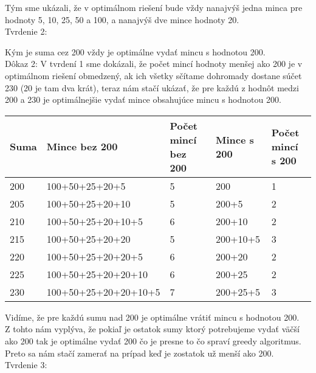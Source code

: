 \documentclass[a4paper]{article}
\begin{document}
Tým sme ukázali, že v optimálnom riešení bude vždy nanajvýš jedna minca pre hodnoty 5, 10, 25, 50 a 100, a nanajvýš dve mince hodnoty 20.
\\

Tvrdenie 2:

Kým je suma cez 200 vždy je optimálne vydať mincu s hodnotou 200.
\\

Dôkaz 2:
V tvrdení 1 sme dokázali, že počet mincí hodnoty menšej ako 200 je v optimálnom riešení obmedzený, ak ich všetky sčítame dohromady dostane súčet 230 (20 je tam dva krát), teraz nám stačí ukázať, že pre každú z hodnôt medzi 200 a 230 je optimálnejšie vydať mince obsahujúce mincu s hodnotou 200.

\begin{table}[!h]
	\begin{tabular}{|l|l|l|l|l|}
		\hline
		Suma & Mince bez 200        & Počet mincí bez 200 & Mince s 200 & Počet mincí s 200 \\ \hline
		200  & 100+50+25+20+5       & 5                   & 200         & 1                 \\ \hline
		205  & 100+50+25+20+10      & 5                   & 200+5       & 2                 \\ \hline
		210  & 100+50+25+20+10+5    & 6                   & 200+10      & 2                 \\ \hline
		215  & 100+50+25+20+20      & 5                   & 200+10+5    & 3                 \\ \hline
		220  & 100+50+25+20+20+5    & 6                   & 200+20      & 2                 \\ \hline
		225  & 100+50+25+20+20+10   & 6                   & 200+25      & 2                 \\ \hline
		230  & 100+50+25+20+20+10+5 & 7                   & 200+25+5    & 3                 \\ \hline
	\end{tabular}
\end{table}
Vidíme, že pre každú sumu nad 200 je optimálne vrátiť mincu s hodnotou 200. 
\\

Z tohto nám vyplýva, že pokiaľ je ostatok sumy ktorý potrebujeme vydať väčší ako 200 tak je optimálne vydať 200 čo je presne to čo spraví greedy algoritmus. Preto sa nám stačí zamerať na prípad keď je zostatok už menší ako 200.
\\

Tvrdenie 3:
\end{document}
